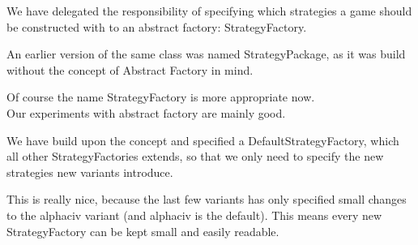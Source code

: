 We have delegated the responsibility of specifying which strategies a game should be constructed with to an abstract factory: StrategyFactory.

An earlier version of the same class was named StrategyPackage, as it was build without the concept of Abstract Factory in mind.

Of course the name StrategyFactory is more appropriate now.
\\

Our experiments with abstract factory are mainly good. 

We have build upon the concept and specified a DefaultStrategyFactory, which all other StrategyFactories extends, so that we only need to specify the new strategies new variants introduce.

This is really nice, because the last few variants has only specified small changes to the alphaciv variant (and alphaciv is the default).
This means every new StrategyFactory can be kept small and easily readable.


